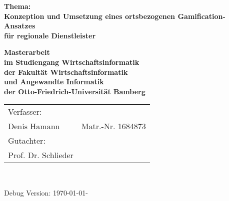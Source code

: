 \begin{titlepage}

{\sffamily
\vspace*{1cm}
\begin{center}
	\bfseries
	\Large {Thema:\\Konzeption und Umsetzung eines ortsbezogenen Gamification-Ansatzes\\
	für regionale Dienstleister}
\end{center}
\vspace{1cm}
\begin{center}

	{\large\bfseries Masterarbeit\\[5mm]}
	\vspace*{2cm}
	{\large\bfseries im Studiengang Wirtschaftsinformatik\\[5mm]}
	{\large\bfseries der Fakultät Wirtschaftsinformatik\\[5mm]}
	{\large\bfseries und Angewandte Informatik\\[5mm]}
	{\large\bfseries der Otto-Friedrich-Universität Bamberg\\[5mm]}


\end{center}
}

\vspace*{3cm}
\begin{large}

\begin{tabular}{ll}
		Verfasser:\\
		Denis Hamann & Matr.-Nr. 1684873 \\[3mm]
		
		Gutachter:\\
		Prof. Dr. Schlieder\\[3mm]


\end{tabular}\\[0.5cm]

\end{large}
{\footnotesize Debug Version: \today  - \currenttime}


\end{titlepage}